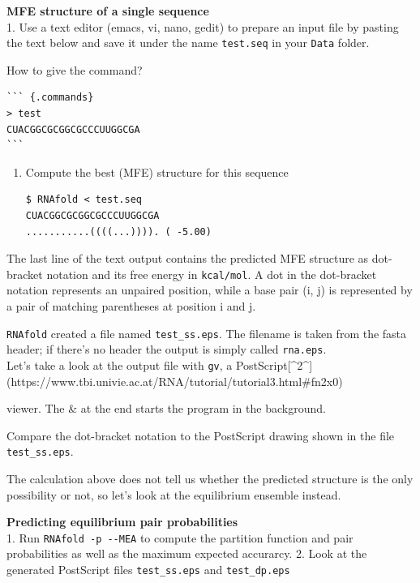 \documentclass[]{article}
\providecommand{\tightlist}{%
  \setlength{\itemsep}{0pt}\setlength{\parskip}{0pt}}
\newcommand\todo[1]{\color{red}#1\color{black}}
\begin{document}
\textbf{MFE structure of a single sequence}\\
\todo{1. Use a text editor (emacs, vi, nano, gedit) to prepare an input file by
pasting the text below and save it under the name \texttt{test.seq} in
your \texttt{Data} folder.}

\todo{How to give the command?}

\begin{verbatim}
``` {.commands}
> test
CUACGGCGCGGCGCCCUUGGCGA
```
\end{verbatim}

\begin{enumerate}
\def\labelenumi{\arabic{enumi}.}
\setcounter{enumi}{1}
\tightlist
\item
  Compute the best (MFE) structure for this sequence

\begin{verbatim}
$ RNAfold < test.seq
CUACGGCGCGGCGCCCUUGGCGA
...........((((...)))). ( -5.00)
\end{verbatim}
\end{enumerate}

The last line of the text output contains the predicted MFE structure as
dot-bracket notation and its free energy in \texttt{kcal/mol}. A dot in
the dot-bracket notation represents an unpaired position, while a base
pair (i, j) is represented by a pair of matching parentheses at position
i and j.

\texttt{RNAfold} created a file named \texttt{test\_ss.eps}. The filename
is taken from the fasta header; if there's no header the output is
simply called \texttt{rna.eps}.\\
Let's take a look at the output file with \texttt{gv}, a
PostScript{{[}\^{}2\^{}{]}(https://www.tbi.univie.ac.at/RNA/tutorial/tutorial3.html\#fn2x0)}
viewer. The \& at the end starts the program in the background.

Compare the dot-bracket notation to the PostScript drawing shown in the
file \texttt{test\_ss.eps}.

The calculation above does not tell us whether the predicted structure
is the only possibility or not, so let's look at the equilibrium
ensemble instead.

\textbf{Predicting equilibrium pair probabilities}\\
1. Run \texttt{RNAfold\ -p\ -\/-MEA} to compute the partition function
and pair probabilities as well as the maximum expected accurarcy. 2.
Look at the generated PostScript files \texttt{test\_ss.eps} and
\texttt{test\_dp.eps}
\end{document}
